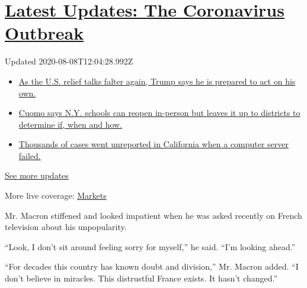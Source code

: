 \hypertarget{latest-updates-the-coronavirus-outbreak}{%
\section{\texorpdfstring{\href{https://www.nytimes.com/2020/08/07/world/covid-19-news.html?action=click\&pgtype=Article\&state=default\&region=MAIN_CONTENT_1\&context=storylines_live_updates}{Latest
Updates: The Coronavirus
Outbreak}}{Latest Updates: The Coronavirus Outbreak}}\label{latest-updates-the-coronavirus-outbreak}}

Updated 2020-08-08T12:04:28.992Z

\begin{itemize}
\tightlist
\item
  \href{https://www.nytimes.com/2020/08/07/world/covid-19-news.html?action=click\&pgtype=Article\&state=default\&region=MAIN_CONTENT_1\&context=storylines_live_updates\#link-1f86d03a}{As
  the U.S. relief talks falter again, Trump says he is prepared to act
  on his own.}
\item
  \href{https://www.nytimes.com/2020/08/07/world/covid-19-news.html?action=click\&pgtype=Article\&state=default\&region=MAIN_CONTENT_1\&context=storylines_live_updates\#link-3f64a70a}{Cuomo
  says N.Y. schools can reopen in-person but leaves it up to districts
  to determine if, when and how.}
\item
  \href{https://www.nytimes.com/2020/08/07/world/covid-19-news.html?action=click\&pgtype=Article\&state=default\&region=MAIN_CONTENT_1\&context=storylines_live_updates\#link-14e70066}{Thousands
  of cases went unreported in California when a computer server failed.}
\end{itemize}

\href{https://www.nytimes.com/2020/08/07/world/covid-19-news.html?action=click\&pgtype=Article\&state=default\&region=MAIN_CONTENT_1\&context=storylines_live_updates}{See
more updates}

More live coverage:
\href{https://www.nytimes.com/live/2020/08/07/business/stock-market-today-coronavirus?action=click\&pgtype=Article\&state=default\&region=MAIN_CONTENT_1\&context=storylines_live_updates}{Markets}

Mr. Macron stiffened and looked impatient when he was asked recently on
French television about his unpopularity.

``Look, I don't sit around feeling sorry for myself,'' he said. ``I'm
looking ahead.''

``For decades this country has known doubt and division,'' Mr. Macron
added. ``I don't believe in miracles. This distrustful France exists. It
hasn't changed.''

